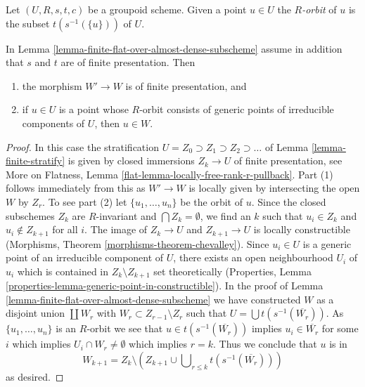 \noindent
Let $(U, R, s, t, c)$ be a groupoid scheme. Given a point $u \in U$
the {\it $R$-orbit} of $u$ is the subset $t(s^{-1}(\{u\}))$ of $U$.

\begin{lemma}
\label{lemma-finite-flat-over-almost-dense-subscheme-addendum}
In Lemma \ref{lemma-finite-flat-over-almost-dense-subscheme}
assume in addition that $s$ and $t$ are of finite presentation.
Then
\begin{enumerate}
\item the morphism $W' \to W$ is of finite presentation, and
\item if $u \in U$ is a point whose $R$-orbit consists of
generic points of irreducible components of $U$, then $u \in W$.
\end{enumerate}
\end{lemma}

\begin{proof}
In this case the stratification
$U = Z_0 \supset Z_1 \supset Z_2 \supset \ldots$ of
Lemma \ref{lemma-finite-stratify} is given by closed immersions $Z_k \to U$
of finite presentation, see
More on Flatness, Lemma \ref{flat-lemma-locally-free-rank-r-pullback}.
Part (1) follows immediately from this as $W' \to W$ is locally given
by intersecting the open $W$ by $Z_r$. To see part (2)
let $\{u_1, \ldots, u_n\}$ be the orbit of $u$.
Since the closed subschemes $Z_k$ are $R$-invariant and
$\bigcap Z_k = \emptyset$, we find an $k$ such that $u_i \in Z_k$
and $u_i \not \in Z_{k + 1}$ for all $i$.
The image of $Z_k \to U$ and $Z_{k + 1} \to U$ is locally constructible
(Morphisms, Theorem \ref{morphisms-theorem-chevalley}).
Since $u_i \in U$ is a generic point of an irreducible component
of $U$, there exists an open neighbourhood $U_i$ of $u_i$ which
is contained in $Z_k \setminus Z_{k + 1}$ set theoretically
(Properties, Lemma \ref{properties-lemma-generic-point-in-constructible}).
In the proof of Lemma \ref{lemma-finite-flat-over-almost-dense-subscheme}
we have constructed $W$ as a disjoint union $\coprod W_r$
with $W_r \subset Z_{r - 1} \setminus Z_r$ such that
$U = \bigcup t(s^{-1}(\overline{W_r}))$. As $\{u_1, \ldots, u_n\}$
is an $R$-orbit we see that $u \in t(s^{-1}(\overline{W_r}))$
implies $u_i \in \overline{W_r}$ for some $i$ which implies
$U_i \cap W_r \not = \emptyset$ which implies $r = k$.
Thus we conclude that $u$ is in
$$
W_{k + 1} = Z_k \setminus
\left(
Z_{k + 1} \cup \bigcup\nolimits_{r \leq k} t(s^{-1}(\overline{W_r}))
\right)
$$
as desired.
\end{proof}

